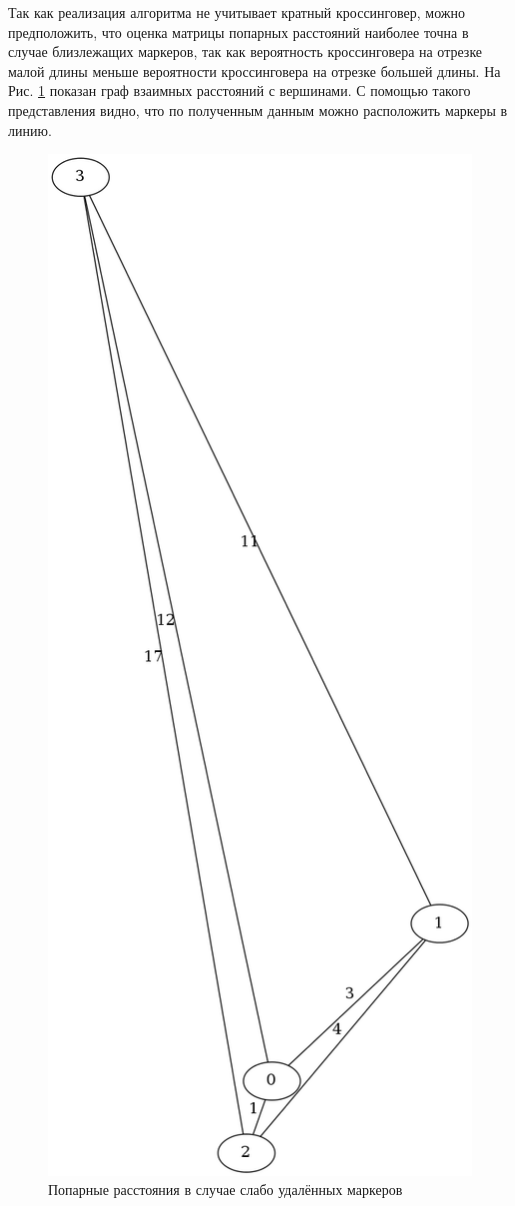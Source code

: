 \documentclass{matmex-diploma-custom}
\begin{document}
Так как реализация алгоритма не учитывает кратный кроссинговер, можно
предположить, что оценка матрицы попарных расстояний наиболее точна в
случае близлежащих маркеров, так как вероятность кроссинговера на
отрезке малой длины меньше вероятности кроссинговера на отрезке
большей длины. На Рис. \ref{fig:fig1} показан граф взаимных расстояний
с вершинами. С помощью такого представления видно, что по полученным
данным можно расположить маркеры в линию.
\begin{figure}[h]
 \centering
  \includegraphics[width=1.0\textwidth]{good.png}
  \caption[width=0.4\textwidth]{Попарные расстояния в случае слабо
    удалённых маркеров}
  \label{fig:fig1}
\end{figure}
\end{document}
